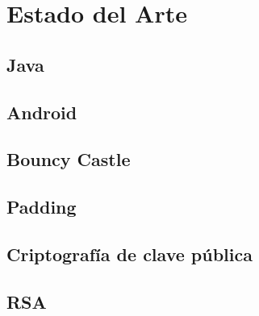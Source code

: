 
\chapter{Estado del Arte} %

\label{Chapter3} %


 \section{Java}


 \section{Android}


 \section{Bouncy Castle}


 \section{Padding}


 \section{Criptografía de clave pública}


 \section{RSA}


